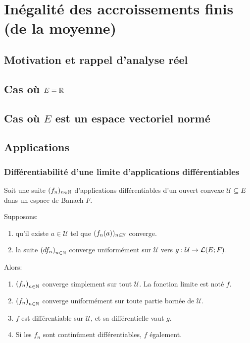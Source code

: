 \chapter{Inégalité des accroissements finis (de la moyenne)}

\section*{Motivation et rappel d'analyse réel}

\section{Cas où $E = \mathbb{R}$}

\section{Cas où $E$ est un espace vectoriel normé}

\section{Applications}

\subsection{Différentiabilité d'une limite d'applications différentiables}

\begin{corollary}
	Soit une suite $(f_{n})_{n \in \mathbb{N}}$ d'applications différentiables d'un ouvert convexe
	$\mathcal{U} \subseteq E$ dans un espace de Banach $F$.

	Supposons:
	\begin{enumerate}
		\item qu'il existe $a \in \mathcal{U}$ tel que $(f_{n}(a))_{n \in
			\mathbb{N}}$ converge.
		\item la suite ${(df_{n})}_{n \in \mathbb{N}}$ converge uniformément sur
			$\mathcal{U}$ vers
			$g : \mathcal{U} \rightarrow \mathcal{L}(E; F)$.
	\end{enumerate}

	Alors:

	\begin{enumerate}
		\item ${(f_{n})}_{n \in \mathbb{N}}$ converge simplement sur tout
			$\mathcal{U}$. La fonction limite est noté $f$.
		\item ${(f_{n})}_{n \in \mathbb{N}}$ converge uniformément sur toute
			partie bornée de $\mathcal{U}$.
		\item $f$ est différentiable sur $\mathcal{U}$, et sa différentielle
			vaut $g$.
		\item Si les $f_{n}$ sont continûment différentiables, $f$ également.
	\end{enumerate}
\end{corollary}

